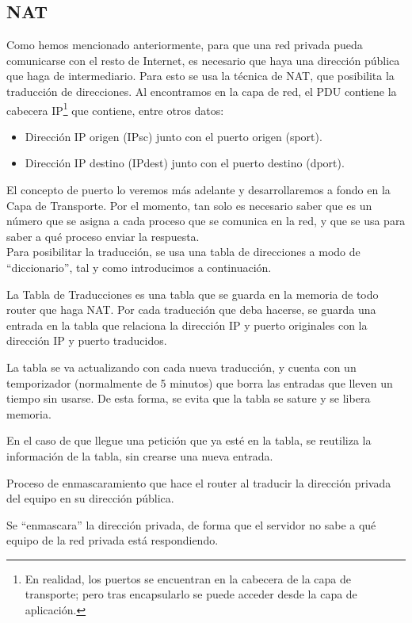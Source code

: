 \subsection{\acrfull{NAT}}

Como hemos mencionado anteriormente, para que una red privada pueda comunicarse con el resto de Internet, es necesario que haya una dirección pública que haga de intermediario. Para esto se usa la técnica de \acrshort{NAT}, que posibilita la traducción de direcciones.
Al encontramos en la capa de red, el \acrshort{PDU} contiene la cabecera IP\footnote{En realidad, los puertos se encuentran en la cabecera de la capa de transporte; pero tras encapsularlo se puede acceder desde la capa de aplicación.} que contiene, entre otros datos:
\begin{itemize}
    \item Dirección IP origen ({IPsc}) junto con el puerto origen ({sport}).
    \item Dirección IP destino ({IPdest}) junto con el puerto destino ({dport}).
\end{itemize}

El concepto de puerto lo veremos más adelante y desarrollaremos a fondo en la Capa de Transporte. Por el momento, tan solo es necesario saber que es un número que se asigna a cada proceso que se comunica en la red, y que se usa para saber a qué proceso enviar la respuesta.\\

Para posibilitar la traducción, se usa una tabla de direcciones a modo de ``diccionario'', tal y como introducimos a continuación.
\begin{definicion}
    La Tabla de Traducciones es una tabla que se guarda en la memoria de todo router que haga \acrshort{NAT}.
    Por cada traducción que deba hacerse, se guarda una entrada en la tabla que relaciona la dirección IP y puerto originales con la dirección IP y puerto traducidos.

    La tabla se va actualizando con cada nueva traducción, y cuenta con un temporizador (normalmente de 5 minutos) que borra las entradas que lleven un tiempo sin usarse. De esta forma, se evita que la tabla se sature y se libera memoria.

    En el caso de que llegue una petición que ya esté en la tabla, se reutiliza la información de la tabla, sin crearse una nueva entrada.
\end{definicion}

\begin{definicion}
    Proceso de enmascaramiento que hace el router al traducir la dirección privada del equipo en su dirección pública.

    Se ``enmascara'' la dirección privada, de forma que el servidor no sabe a qué equipo de la red privada está respondiendo.
\end{definicion}

